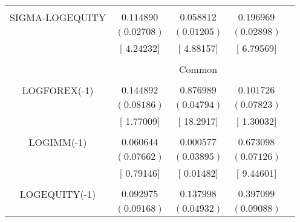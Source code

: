 \begin{tabular}{lrrrr}
\multicolumn{1}{c}{}&\multicolumn{1}{c}{}&\multicolumn{1}{c}{}&\multicolumn{1}{c}{}&\multicolumn{1}{c}{}\\
\multicolumn{1}{c}{SIGMA-LOGEQUITY}&\multicolumn{1}{c}{$0.114890$}&\multicolumn{1}{c}{$0.058812$}&\multicolumn{1}{c}{$0.196969$}&\multicolumn{1}{c}{}\\
\multicolumn{1}{c}{}&\multicolumn{1}{c}{$(0.02708)$}&\multicolumn{1}{c}{$(0.01205)$}&\multicolumn{1}{c}{$(0.02898)$}&\multicolumn{1}{c}{}\\
\multicolumn{1}{c}{}&\multicolumn{1}{c}{[ 4.24232]}&\multicolumn{1}{c}{[ 4.88157]}&\multicolumn{1}{c}{[ 6.79569]}&\multicolumn{1}{c}{}\\
[4.5pt] \hline \\ [-4.5pt]
\multicolumn{1}{c}{}&\multicolumn{3}{c}{Common}&\multicolumn{1}{c}{}\\
[4.5pt] \hline \\ [-4.5pt]
\multicolumn{1}{c}{LOGFOREX(-1)}&\multicolumn{1}{c}{$0.144892$}&\multicolumn{1}{c}{$0.876989$}&\multicolumn{1}{c}{$0.101726$}&\multicolumn{1}{c}{}\\
\multicolumn{1}{c}{}&\multicolumn{1}{c}{$(0.08186)$}&\multicolumn{1}{c}{$(0.04794)$}&\multicolumn{1}{c}{$(0.07823)$}&\multicolumn{1}{c}{}\\
\multicolumn{1}{c}{}&\multicolumn{1}{c}{[ 1.77009]}&\multicolumn{1}{c}{[ 18.2917]}&\multicolumn{1}{c}{[ 1.30032]}&\multicolumn{1}{c}{}\\
\multicolumn{1}{c}{}&\multicolumn{1}{c}{}&\multicolumn{1}{c}{}&\multicolumn{1}{c}{}&\multicolumn{1}{c}{}\\
\multicolumn{1}{c}{LOGIMM(-1)}&\multicolumn{1}{c}{$0.060644$}&\multicolumn{1}{c}{$0.000577$}&\multicolumn{1}{c}{$0.673098$}&\multicolumn{1}{c}{}\\
\multicolumn{1}{c}{}&\multicolumn{1}{c}{$(0.07662)$}&\multicolumn{1}{c}{$(0.03895)$}&\multicolumn{1}{c}{$(0.07126)$}&\multicolumn{1}{c}{}\\
\multicolumn{1}{c}{}&\multicolumn{1}{c}{[ 0.79146]}&\multicolumn{1}{c}{[ 0.01482]}&\multicolumn{1}{c}{[ 9.44601]}&\multicolumn{1}{c}{}\\
\multicolumn{1}{c}{}&\multicolumn{1}{c}{}&\multicolumn{1}{c}{}&\multicolumn{1}{c}{}&\multicolumn{1}{c}{}\\
\multicolumn{1}{c}{LOGEQUITY(-1)}&\multicolumn{1}{c}{$0.092975$}&\multicolumn{1}{c}{$0.137998$}&\multicolumn{1}{c}{$0.397099$}&\multicolumn{1}{c}{}\\
\multicolumn{1}{c}{}&\multicolumn{1}{c}{$(0.09168)$}&\multicolumn{1}{c}{$(0.04932)$}&\multicolumn{1}{c}{$(0.09088)$}&\multicolumn{1}{c}{}\\

\end{tabular}
